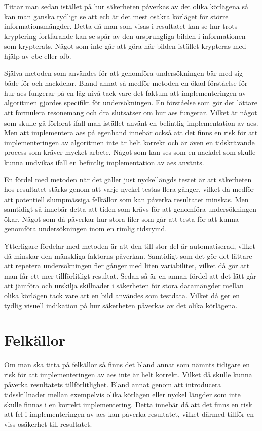 Tittar man sedan istället på hur säkerheten påverkas av det olika körlägena så kan man ganska tydligt se att \acrshort{ecb} är det mest osäkra körläget för större informationsmängder.
Detta då man som visas i resultatet kan se hur trots kryptering fortfarande kan se spår av den ursprungliga bilden i informationen som krypterats. Något som inte
går att göra när bilden istället krypteras med hjälp av \acrshort{cbc} eller \acrshort{ofb}.

Själva metoden som användes för att genomföra undersökningen bär med sig både för och nackdelar. Bland annat så medför metoden en ökad förståelse för hur \acrfull{aes} fungerar
på en låg nivå tack vare det faktum att implementeringen av algoritmen gjordes specifikt för undersökningen. En förståelse som gör det lättare att formulera resonemang och
dra slutsatser om hur \acrshort{aes} fungerar. Vilket är något som skulle gå förlorat ifall man istället använt en befintlig implementation av \acrshort{aes}. Men att implementera
\acrshort{aes} på egenhand innebär också att det finns en risk för att implementeringen av algoritmen inte är helt korrekt och är även en tidskrävande process som kräver
mycket arbete. Något som kan ses som en nackdel som skulle kunna undvikas ifall en befintlig implementation av \acrshort{aes} använts.

En fördel med metoden när det gäller just nyckellängds testet är att säkerheten hos resultatet stärks genom att varje nyckel testas flera gånger, vilket då medför att
potentiell slumpmässiga felkällor som kan påverka resultatet minskas. Men samtidigt så innebär detta att tiden som krävs för att genomföra undersökningen ökar. Något som
då påverkar hur stora filer som går att testa för att kunna genomföra undersökningen inom en rimlig tidsrymd.

Ytterligare fördelar med metoden är att den till stor del är automatiserad, vilket då minskar den mänskliga faktorns påverkan. Samtidigt som det gör det lättare att
repetera undersökningen fler gånger med liten variabilitet, vilket då gör att man får ett mer tillförlitligt resultat. Sedan så är
en annan fördel att det lätt går att jämföra och urskilja skillnader i säkerheten för stora datamängder mellan olika körlägen tack vare att en bild användes som testdata.
Vilket då ger en tydlig visuell indikation på hur säkerheten påverkas av det olika körlägena.

\section{Felkällor} %
\label{sec:errors}
Om man ska titta på felkällor så finns det bland annat som nämnts tidigare en risk för att implementeringen av \acrshort{aes} inte är helt korrekt. Vilket
då skulle kunna påverka resultatets tillförlitlighet. Bland annat genom att introducera tidsskillnader mellan exempelvis olika körlägen eller nyckel längder som inte skulle finnas i en korrekt implementering. Detta innebär
då att det finns en risk att fel i implementeringen av \acrshort{aes} kan påverka resultatet, vilket därmed tillför en viss osäkerhet till resultatet. %

